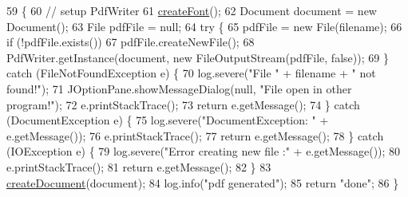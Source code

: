 \begin{DoxyCode}
59                                              \{
60         \textcolor{comment}{// setup PdfWriter}
61         \hyperlink{classit_1_1isislab_1_1masonassisteddocumentation_1_1mason_1_1control_1_1_pdf_rtf_generator_af1f9a21f995c47a9e1a5a6f276c97852}{createFont}();
62         Document document = \textcolor{keyword}{new} Document();
63         File pdfFile = null;
64         \textcolor{keywordflow}{try} \{
65             pdfFile = \textcolor{keyword}{new} File(filename);
66             \textcolor{keywordflow}{if} (!pdfFile.exists())
67                 pdfFile.createNewFile();
68             PdfWriter.getInstance(document, \textcolor{keyword}{new} FileOutputStream(pdfFile, \textcolor{keyword}{false}));
69         \} \textcolor{keywordflow}{catch} (FileNotFoundException e) \{
70             log.severe(\textcolor{stringliteral}{"File "} + filename + \textcolor{stringliteral}{" not found!"});
71             JOptionPane.showMessageDialog(null, \textcolor{stringliteral}{"File open in other program!"});
72             e.printStackTrace();
73             \textcolor{keywordflow}{return} e.getMessage();
74         \} \textcolor{keywordflow}{catch} (DocumentException e) \{
75             log.severe(\textcolor{stringliteral}{"DocumentException: "} + e.getMessage());
76             e.printStackTrace();
77             \textcolor{keywordflow}{return} e.getMessage();
78         \} \textcolor{keywordflow}{catch} (IOException e) \{
79             log.severe(\textcolor{stringliteral}{"Error creating new file :"} + e.getMessage());
80             e.printStackTrace();
81             \textcolor{keywordflow}{return} e.getMessage();
82         \}
83         \hyperlink{classit_1_1isislab_1_1masonassisteddocumentation_1_1mason_1_1control_1_1_pdf_rtf_generator_add23c0e308cdf54a3c1e3a8128ea29ed}{createDocument}(document);
84         log.info(\textcolor{stringliteral}{"pdf generated"});
85         \textcolor{keywordflow}{return} \textcolor{stringliteral}{"done"};
86     \}
\end{DoxyCode}


